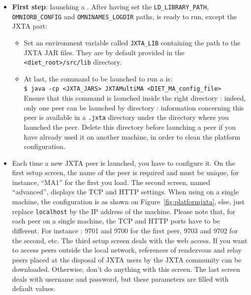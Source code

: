\begin{itemize}

\item{\textbf{First step}: launching a \MAj. After having set the
  \texttt{LD\_LIBRARY\_PATH}, \\ \texttt{OMNIORB\_CONFIG} and
  \texttt{OMNINAMES\_LOGDIR} paths, \diet is ready to run, except the JXTA
  part:}
  \begin{itemize}
  \item{Set an environment variable called \texttt{JXTA\_LIB} containing the
    path to the JXTA JAR files. They are by default provided in the
    \texttt{<diet\_root>/src/lib} directory.}

  \item{At last, the command to be launched to run a \MAj is:\\
    \noindent
        {\footnotesize \texttt{\$ java -cp <JXTA\_JARS> JXTAMultiMA
            <DIET\_MA\_config\_file>} } \\Ensure that this command is launched
        inside the right directory : indeed, only one peer can be launched by
        directory : information concerning this peer is available in a
        \texttt{.jxta} directory under the directory where you launched the
        peer.  Delete this directory before launching a peer if you have
        already used it on another machine, in order to clean the platform
        configuration.}
  \end{itemize}
    
\item{Each time a new JXTA peer is launched, you have to configure it.  On the
  first setup screen, the name of the peer is required and must be unique, for
  instance, ``MA1'' for the first \MAj you load. The second screen, named
  ``advanced'', displays the TCP and HTTP settings. When using \dietj on a
  single machine, the configuration is as shown on
  Figure~\ref{fig:platformjxta}, else, just replace \texttt{localhost} by the
  IP address of the machine.  Please note that, for each peer on a single
  machine, the TCP and HTTP ports have to be different. For instance : 9701 and
  9700 for the first peer, 9703 and 9702 for the second, etc. The third setup
  screen deals with the web access. If you want to access peers outside the
  local network, references of rendezvous and relay peers placed at the
  disposal of JXTA users by the JXTA community can be downloaded. Otherwise,
  don't do anything with this screen. The last screen deals with username and
  password, but these parameters are filled with default values.}


\end{itemize}
